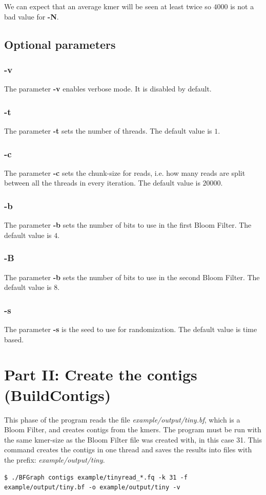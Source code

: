 \documentclass[a4paper]{report}
\renewcommand{\b}[1]{\textbf{#1}}  %
\newcommand{\e}[1]{\emph{#1}}    %
\begin{document}
We can expect that an average kmer will be seen at least twice so $4000$ is not a bad value for \b{-N}.

\subsection{Optional parameters}

\subsubsection{\b{-v}}
The parameter \b{-v} enables verbose mode. It is disabled by default.
\subsubsection{\b{-t}}
The parameter \b{-t} sets the number of threads. The default value is $1$.
\subsubsection{\b{-c}}
The parameter \b{-c} sets the chunk-size for reads, i.e. how many reads are split between all the threads in every iteration. 
The default value is $20000$.
\subsubsection{\b{-b}}
The parameter \b{-b} sets the number of bits to use in the first Bloom Filter. 
The default value is $4$.
\subsubsection{\b{-B}}
The parameter \b{-b} sets the number of bits to use in the second Bloom Filter. 
The default value is $8$.
\subsubsection{\b{-s}}
The parameter \b{-s} is the seed to use for randomization. The default value is time based.

\newpage
\section{Part II: Create the contigs (BuildContigs)}
This phase of the program reads the file \e{example/output/tiny.bf}, which is a Bloom Filter, and creates contigs from the kmers. 
The program must be run with the same kmer-size as the Bloom Filter file was created with, in this case 31.
This command creates the contigs in one thread and saves the results into files with the prefix: \e{example/output/tiny}.
\footnotesize
\begin{verbatim}
$ ./BFGraph contigs example/tinyread_*.fq -k 31 -f example/output/tiny.bf -o example/output/tiny -v
\end{verbatim}
\normalsize
\end{document}
